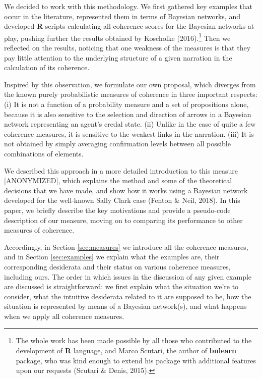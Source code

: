 \documentclass[
  10pt,
]{scrartcl}
\begin{document}
We decided to work with this methodology. We first gathered key examples that occur in the literature, represented them in terms of Bayesian networks, and developed \textbf{\textsf{R}} scripts calculating all coherence scores for the Bayesian networks at play, pushing further the results obtained by Koscholke (2016).\footnote{
  The whole work has been made possible by all those who contributed to the development of \textsf{\textbf{R}} language, and Marco Scutari, the author of \textsf{\textbf{bnlearn}} package, who was kind enough to extend his package with additional features upon our requests (Scutari \& Denis, 2015).} Then we reflected on the results, noticing that one weakness of the measures is that they pay little attention to the underlying structure of a given narration in the calculation of its coherence.

Inspired by this observation, we formulate our own proposal, which diverges from the known purely probabilistic measures of coherence in three important respects: (i) It is not a function of a probability measure and a set
of propositions alone, because it is also sensitive to the selection and direction of arrows in a Bayesian network representing an agent's credal state. (ii) Unlike in the case of quite a few coherence measures, it is sensitive to
the weakest links in the narration. (iii) It is not obtained by simply averaging confirmation levels between all possible combinations of elements.

We described this approach in a more detailed introduction to this measure {[}ANONYMIZED{]}, which explains the method and some of the theoretical decisions that we have made, and show how it works using a Bayesian network developed for the well-known Sally Clark case (Fenton \& Neil, 2018). In this paper, we briefly describe the key motivations and provide a pseudo-code description of our measure, moving on to comparing its performance to other measures of coherence.

Accordingly, in Section \ref{sec:measures} we introduce all the coherence measures, and in Section \ref{sec:examples} we explain what the examples are, their corresponding desiderata and their status on various coherence measures, including ours. The order in which issues in the discussion of any given example are discussed is straightforward: we first explain what the situation we're to consider, what the intuitive desiderata related to it are supposed to be, how the situation is represented by means of a Bayesian network(s), and what happens when we apply all coherence measures.
\end{document}
